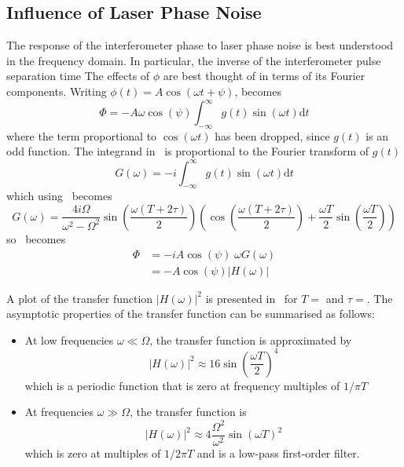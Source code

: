 \subsection{Influence of Laser Phase Noise}\label{subsec:laser_phase}
The response of the interferometer phase to laser phase noise is
best understood in the frequency domain. In particular, the inverse
of the interferometer pulse separation time 
The effects of \(\phi\) are best
thought of in terms of its Fourier components. Writing \(\phi(t) = A
\cos(\omega t + \psi)\),  becomes
\begin{equation}
  \Phi = - A \omega \cos(\psi) \int_{-\infty}^\infty g(t) \sin(\omega
  t) \mathrm{d} t
  \label{eq:phase_fourier}
\end{equation}
where the term proportional to \(\cos(\omega t)\) has been dropped,
since \(g(t)\) is an odd function. The integrand
in~ is proportional to the Fourier
transform of \(g(t)\)
\begin{equation}
  G(\omega) = -i \int_{-\infty}^{\infty} g(t) \sin(\omega t)
  \mathrm{d} t
  \label{eq:sensitvity_fourier}
\end{equation}
which using~
becomes~\cite{Canuel2007}
\begin{equation}
  G(\omega) = \frac{4 i
  \Omega}{\omega^2-\Omega^2}\sin\left(\frac{\omega(T+2\tau)}{2}\right)\left(\cos\left(\frac{\omega(T+2\tau)}{2}\right)
  + \frac{\omega T}{2}\sin \left(\frac{\omega T}{2}\right)\right)
  \label{eq:sens_fourier_full}
\end{equation}
so~ becomes
\begin{align}
  \Phi &= -i A \cos(\psi) \;\omega G(\omega) \nonumber \\
  &= - A \cos(\psi) \lvert H(\omega)\rvert
  \label{eq:interfometer_fourier}
\end{align}
\par\noindent
A plot of the transfer function \(|H(\omega)|^2\) is presented
in~ for
\(T= \) and \(\tau
= \). The asymptotic properties of the
transfer function can be summarised as follows:
\begin{itemize}
  \item At low frequencies \(\omega \ll \Omega\), the transfer
    function is approximated by 
    \begin{equation}
      |H(\omega)|^2 \approx 16 \sin \left(\frac{\omega T}{2}\right)^4
    \end{equation}
    which is a periodic function that is zero at frequency multiples
    of \(1/\pi T\) \\
  \item At frequencies \(\omega \gg \Omega\), the transfer function is
    \begin{equation}
      |H(\omega)|^2 \approx 4 \frac{\Omega^2}{\omega^2}\sin
      \left(\omega T\right)^2
    \end{equation}
    which is zero at multiples of \(1/2\pi T\) and is a low-pass
    first-order filter.
\end{itemize}
